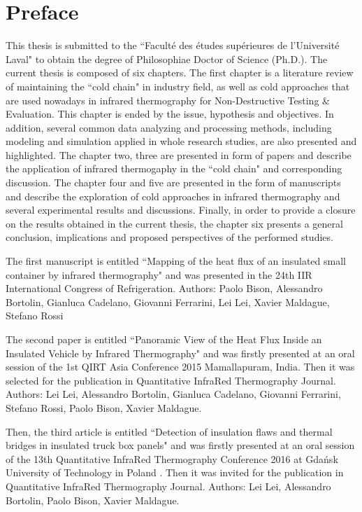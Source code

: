 \chapter*{Preface}         %

This thesis is submitted to the ``Faculté des études supérieures de l'Université Laval" to obtain the degree of Philosophiae Doctor of Science (Ph.D.). The current thesis is composed of six chapters. The first chapter is a literature review of maintaining the ``cold chain" in industry field, as well as cold approaches that are used nowadays in infrared thermography for Non-Destructive Testing \& Evaluation. This chapter is ended by the issue, hypothesis and objectives. In addition, several common data analyzing and processing methods, including modeling and simulation applied in whole research studies, are also presented and highlighted. The chapter two, three are presented in form of papers and describe the application of infrared thermogaphy in the ``cold chain" and corresponding discussion. The chapter four and five are presented in the form of manuscripts and describe the exploration of cold approaches in infrared thermography and several experimental results and discussions. Finally, in order to provide a closure on the results obtained in the current thesis, the chapter six presents a general conclusion, implications and proposed perspectives of the performed studies.

The first manuscript is entitled ``Mapping of the heat flux of an insulated small container by infrared thermography" and was presented in the 24th IIR International Congress of Refrigeration. Authors: Paolo Bison, Alessandro Bortolin, Gianluca Cadelano, Giovanni Ferrarini, Lei Lei, Xavier Maldague, Stefano Rossi

The second paper is entitled ``Panoramic View of the Heat Flux Inside an Insulated Vehicle by Infrared Thermography" and was firstly presented at an oral session of the 1st QIRT Asia Conference 2015 Mamallapuram, India. Then it was selected for the publication in Quantitative InfraRed Thermography Journal. Authors: Lei Lei, Alessandro Bortolin, Gianluca Cadelano, Giovanni Ferrarini, Stefano Rossi, Paolo Bison, Xavier Maldague. 

Then, the third article is entitled ``Detection of insulation flaws and thermal bridges in insulated truck box panels" and was firstly presented at an oral session of the 13th Quantitative InfraRed Thermography Conference 2016 at Gdańsk University of Technology in Poland . Then it was invited for the publication in Quantitative InfraRed Thermography Journal. Authors: Lei Lei, Alessandro Bortolin, Paolo Bison, Xavier Maldague.

